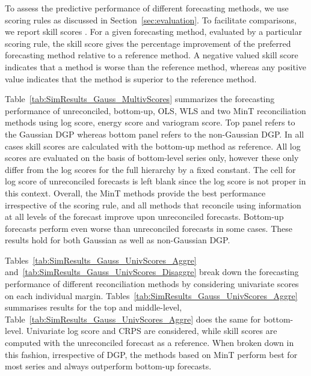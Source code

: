 \documentclass[12pt]{article}
\theoremstyle{definition}
\begin{document}
To assess the predictive performance of different forecasting methods, we use scoring rules as discussed in Section~\ref{sec:evaluation}. To facilitate comparisons, we report skill scores \citep{Gneiting2007}. For a given forecasting method, evaluated by a particular scoring rule, the skill score 
gives the percentage improvement of the preferred forecasting method relative to a reference method. A negative valued skill score indicates that a method is worse than the reference method, whereas any positive value indicates that the method is superior to the reference method.

Table~\ref{tab:SimResults_Gauss_MultivScores} summarizes the forecasting performance of unreconciled, bottom-up, OLS, WLS and two MinT reconciliation methods using log score, energy score and variogram score. Top panel refers to the Gaussian DGP whereas bottom panel refers to the non-Gaussian DGP. In all cases skill scores are calculated with the bottom-up method as reference. All log scores are evaluated on the basis of bottom-level series only, however these only differ from the log scores for the full hierarchy by a fixed constant. The cell for log score of unreconciled forecasts is left blank since the log score is not proper in this context. Overall, the MinT methods provide the best performance irrespective of the scoring rule, and all methods that reconcile using information at all levels of the forecast improve upon unreconciled forecasts. Bottom-up forecasts perform even worse than unreconciled forecasts in some cases. These results hold for both Gaussian as well as non-Gaussian DGP. 

Tables~\ref{tab:SimResults_Gauss_UnivScores_Aggre} and~\ref{tab:SimResults_Gauss_UnivScores_Disaggre} break down the forecasting performance of different reconciliation methods by considering univariate scores on each individual margin.  Tables~\ref{tab:SimResults_Gauss_UnivScores_Aggre} summarises results for the top and middle-level, Table~\ref{tab:SimResults_Gauss_UnivScores_Aggre} does the same for bottom-level. Univariate log score and CRPS are considered, while skill scores are computed with the unreconciled forecast as a reference. When broken down in this fashion, irrespective of DGP, the methods based on MinT perform best for most series and always outperform bottom-up forecasts.
\end{document}
